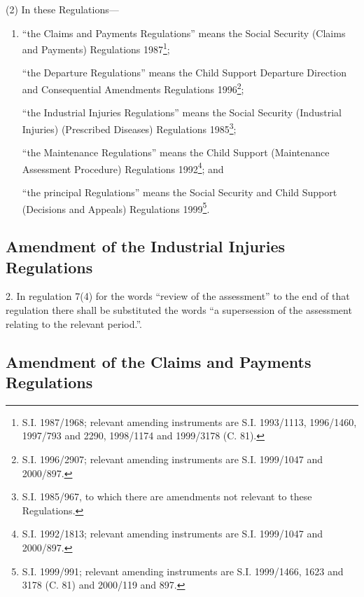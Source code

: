 \documentclass[12pt,a4paper]{article}
\begin{document}
(2) In these Regulations—
\begin{enumerate}\item[]
“the Claims and Payments Regulations” means the Social Security (Claims and Payments) Regulations 1987\footnote{\frenchspacing S.I. 1987/1968; relevant amending instruments are S.I. 1993/1113, 1996/1460, 1997/793 and 2290, 1998/1174 and 1999/3178 (C. 81).};

“the Departure Regulations” means the Child Support Departure Direction and Consequential Amendments Regulations 1996\footnote{\frenchspacing S.I. 1996/2907; relevant amending instruments are S.I. 1999/1047 and 2000/897.};

“the Industrial Injuries Regulations” means the Social Security (Industrial Injuries) (Prescribed Diseases) Regulations 1985\footnote{\frenchspacing S.I. 1985/967, to which there are amendments not relevant to these Regulations.};

“the Maintenance Regulations” means the Child Support (Maintenance Assessment Procedure) Regulations 1992\footnote{\frenchspacing S.I. 1992/1813; relevant amending instruments are S.I. 1999/1047 and 2000/897.}; and

“the principal Regulations” means the Social Security and Child Support (Decisions and Appeals) Regulations 1999\footnote{\frenchspacing S.I. 1999/991; relevant amending instruments are S.I. 1999/1466, 1623 and 3178 (C. 81) and 2000/119 and 897.}.
\end{enumerate}

\subsection[2. Amendment of the Industrial Injuries Regulations]{Amendment of the Industrial Injuries Regulations}

2.  In regulation 7(4) for the words “review of the assessment” to the end of that regulation there shall be substituted the words “a supersession of the assessment relating to the relevant period.”.

\subsection[3--5. Amendment of the Claims and Payments Regulations]{Amendment of the Claims and Payments Regulations}
\end{document}
